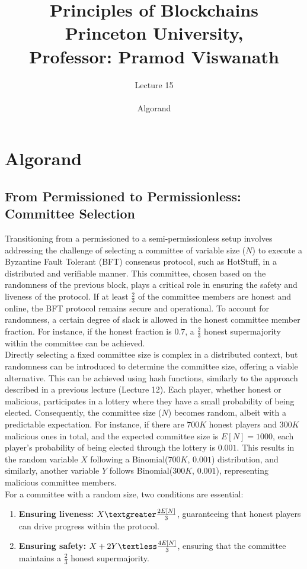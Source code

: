 \documentclass{report}
\title{\Huge{Principles of Blockchains \\ Princeton University,\\
		Professor: Pramod Viswanath}}
\author{\huge{Lecture 15} \\\\ Algorand}
\begin{document}
\maketitle
\newpage%
\tableofcontents
\pagebreak

\chapter{Algorand}
\section{From Permissioned to Permissionless: Committee Selection}
Transitioning from a permissioned to a semi-permissionless setup involves addressing the challenge of selecting a committee of variable size ($N$) to execute a Byzantine Fault Tolerant (BFT) consensus protocol, such as HotStuff, in a distributed and verifiable manner. This committee, chosen based on the randomness of the previous block, plays a critical role in ensuring the safety and liveness of the protocol. If at least $\frac{2}{3}$ of the committee members are honest and online, the BFT protocol remains secure and operational. To account for randomness, a certain degree of slack is allowed in the honest committee member fraction. For instance, if the honest fraction is $0.7$, a $\frac{2}{3}$ honest supermajority within the committee can be achieved.\\
Directly selecting a fixed committee size is complex in a distributed context, but randomness can be introduced to determine the committee size, offering a viable alternative. This can be achieved using hash functions, similarly to the approach described in a previous lecture (Lecture 12). Each player, whether honest or malicious, participates in a lottery where they have a small probability of being elected. Consequently, the committee size ($N$) becomes random, albeit with a predictable expectation. For instance, if there are $700K$ honest players and $300K$ malicious ones in total, and the expected committee size is $E[N] = 1000$, each player's probability of being elected through the lottery is $0.001$. This results in the random variable $X$ following a Binomial($700K$, $0.001$) distribution, and similarly, another variable $Y$ follows Binomial($300K$, $0.001$), representing malicious committee members.\\
For a committee with a random size, two conditions are essential: 
\begin{enumerate}
	\item \textbf{Ensuring liveness:} $X \textgreater \frac{2E[N]}{3}$, guaranteeing that honest players can drive progress within the protocol.
	\item \textbf{Ensuring safety:}  $X + 2Y \textless \frac{4E[N]}{3}$, ensuring that the committee maintains a $\frac{2}{3}$ honest supermajority.
\end{enumerate}
\end{document}
